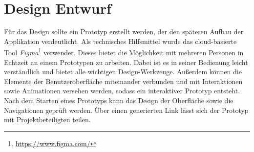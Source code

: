 \section{Design Entwurf}

Für das Design sollte ein Prototyp erstellt werden, der den späteren Aufbau der Applikation verdeutlicht.
Als technisches Hilfsmittel wurde das cloud-basierte Tool \textit{Figma}\footnote{\url{https://www.figma.com/}} verwendet.
Dieses bietet die Möglichkeit mit mehreren Personen in Echtzeit an einem Prototypen zu arbeiten.
Dabei ist es in seiner Bedienung leicht verständlich und bietet alle wichtigen Design-Werkzeuge. 
Außerdem können die Elemente der Benutzeroberfläche miteinander verbunden und mit Interaktionen sowie Animationen versehen werden, sodass ein interaktiver Prototyp entsteht.
Nach dem Starten eines Prototyps kann das Design der Oberfläche sowie die Navigationen geprüft werden.
Über einen generierten Link lässt sich der Prototyp mit Projektbeteiligten teilen. 

